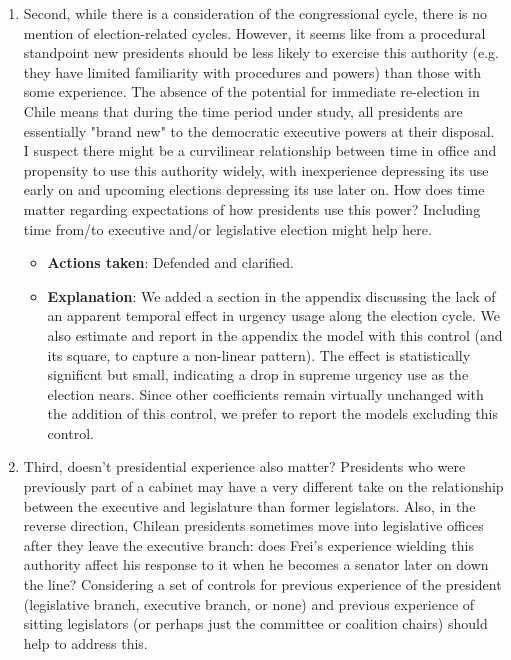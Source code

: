 \documentclass[article,letterpaper,times,12pt,listings-bw,microtype]{article}
\begin{document}
\begin{enumerate}
\begin{itemize}
\end{itemize}
\item Second, while there is a consideration of the congressional cycle, there is no mention of election-related cycles. However, it seems like from a procedural standpoint new presidents should be less likely to exercise this authority (e.g. they have limited familiarity with procedures and powers) than those with some experience. The absence of the potential for immediate re-election in Chile means that during the time period under study, all presidents are essentially "brand new" to the democratic executive powers at their disposal. I suspect there might be a curvilinear relationship between time in office and propensity to use this authority widely, with inexperience depressing its use early on and upcoming elections depressing its use later on. How does time matter regarding expectations of how presidents use this power? Including time from/to executive and/or legislative election might help here.
\label{sec:orgebdf0fa}
\begin{itemize}
\item \textbf{Actions taken}: Defended and clarified.
\item \textbf{Explanation}: We added a section in the appendix discussing the lack of an apparent temporal effect in urgency usage along the election cycle. We also estimate and report in the appendix the model with this control (and its square, to capture a non-linear pattern). The effect is statistically significnt but small, indicating a drop in supreme urgency use as the election nears. Since other coefficients remain virtually unchanged with the addition of this control, we prefer to report the models excluding this control.
\end{itemize}
\item Third, doesn't presidential experience also matter? Presidents who were previously part of a cabinet may have a very different take on the relationship between the executive and legislature than former legislators. Also, in the reverse direction, Chilean presidents sometimes move into legislative offices after they leave the executive branch: does Frei's experience wielding this authority affect his response to it when he becomes a senator later on down the line? Considering a set of controls for previous experience of the president (legislative branch, executive branch, or none) and previous experience of sitting legislators (or perhaps just the committee or coalition chairs) should help to address this.
\label{sec:org45bd085}
\begin{itemize}

\end{itemize}
\end{enumerate}
\end{document}
